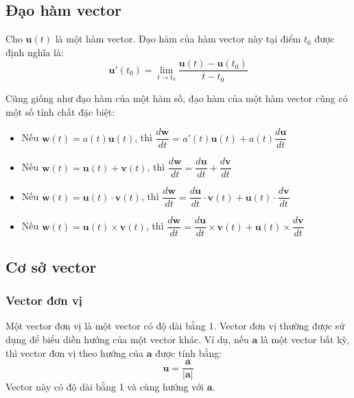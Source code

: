 \subsection{Đạo hàm vector}
\begin{definition}
    Cho \(\mathbf{u}(t)\) là một hàm vector. Đạo hàm của hàm vector này tại điểm \(t_0\) được định nghĩa là:
    \begin{equation}
        \mathbf{u}'(t_0) = \lim_{t \to t_0} \frac{\mathbf{u}(t) - \mathbf{u}(t_0)}{t - t_0}
    \end{equation}
\end{definition}
Cũng giống như đạo hàm của một hàm số, đạo hàm của một hàm vector cũng có một số tính chất đặc biệt:
\begin{itemize}
\item Nếu \(\mathbf{w}(t)=a(t)\mathbf{u}(t)\), thì \(\dfrac{d\mathbf{w}}{dt} = a'(t)\mathbf{u}(t) + a(t)\dfrac{d\mathbf{u}}{dt}\)
\item Nếu \(\mathbf{w}(t)=\mathbf{u}(t) + \mathbf{v}(t)\), thì \(\dfrac{d\mathbf{w}}{dt} = \dfrac{d\mathbf{u}}{dt} + \dfrac{d\mathbf{v}}{dt}\)
\item Nếu \(\mathbf{w}(t)=\mathbf{u}(t) \cdot \mathbf{v}(t)\), thì \(\dfrac{d\mathbf{w}}{dt} = \dfrac{d\mathbf{u}}{dt} \cdot \mathbf{v}(t) + \mathbf{u}(t) \cdot \dfrac{d\mathbf{v}}{dt}\)
\item Nếu \(\mathbf{w}(t)=\mathbf{u}(t) \times \mathbf{v}(t)\), thì \(\dfrac{d\mathbf{w}}{dt} = \dfrac{d\mathbf{u}}{dt} \times \mathbf{v}(t) + \mathbf{u}(t) \times \dfrac{d\mathbf{v}}{dt}\)
\end{itemize}

\subsection{Cơ sở vector}
\subsubsection{Vector đơn vị}
Một vector đơn vị là một vector có độ dài bằng 1. Vector đơn vị thường được sử dụng để biểu diễn hướng của một vector khác. Ví dụ, nếu \(\mathbf{a}\) là một vector bất kỳ, thì vector đơn vị theo hướng của \(\mathbf{a}\) được tính bằng:
\begin{equation}
    \mathbf{u} = \frac{\mathbf{a}}{|\mathbf{a}|} 
\end{equation}
Vector này có độ dài bằng 1 và cùng hướng với \(\mathbf{a}\).
